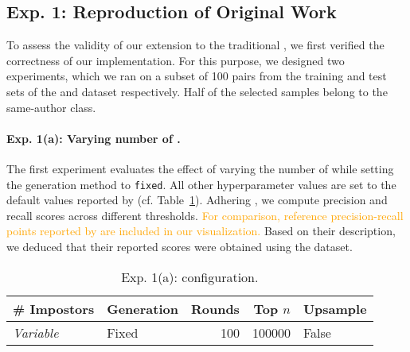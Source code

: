 \subsection{Exp. 1: Reproduction of Original Work}

To assess the validity of our extension to the traditional \impAppr{}, we first verified the correctness of our implementation. 
For this purpose, we designed two experiments, which we ran on a subset of 100 pairs from the training and test sets of the \dataBlog{} and \dataStudent{} dataset respectively. 
Half of the selected samples belong to the same-author class.

\paragraph{Exp. 1(a): Varying number of \imps{}.}
The first experiment evaluates the effect of varying the number of \imps{} while setting the \imp{} generation method to \texttt{fixed}.
All other hyperparameter values are set to the default values reported by \citet{koppel_determining_2014} (cf. Table~\ref{tab:repr_exp1}). 
Adhering \citet{koppel_determining_2014}, we compute precision and recall scores across different thresholds.
\textcolor{orange}{For comparison, reference precision-recall points reported by \citet{koppel_determining_2014} are included in our visualization.} 
Based on their description, we deduced that their reported scores were obtained using the \dataBlog{} dataset.


\begin{table}[h]
\centering\small
\caption{Exp. 1(a): \impAppr{} configuration.}
\label{tab:repr_exp1}
\begin{tabular}{@{}llrrl@{}}   %
\toprule
\# Impostors & Generation & Rounds & Top $n$ & Upsample \\
\midrule
\textit{Variable} & Fixed & 100 & \num{100000} & False \\
\bottomrule
\end{tabular}%
\end{table}



